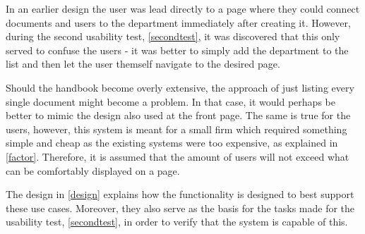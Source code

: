 


In an earlier design the user was lead directly to a page where they could connect documents and users to the department immediately after creating it.
However, during the second usability test, \cref{secondtest}, it was discovered that this only served to confuse the users - it was better to simply add the department to the list and then let the user themself navigate to the desired page.

Should the handbook become overly extensive, the approach of just listing every single document might become a problem.
In that case, it would perhaps be better to mimic the design also used at the front page.
The same is true for the users, however, this system is meant for a small firm which required something simple and cheap as the existing systems were too expensive, as explained in \cref{factor}.
Therefore, it is assumed that the amount of users will not exceed what can be comfortably displayed on a page.

The design in \cref{design} explains how the functionality is designed to best support these use cases.
Moreover, they also serve as the basis for the tasks made for the usability test, \cref{secondtest}, in order to verify that the system is capable of this.
